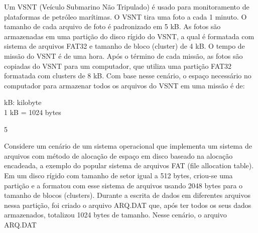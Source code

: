 %
{
\def\AMCbeginQuestion#1#2{\par\noindent{\bf (POSCOMP 2016 - Questão 46})}
\begin{question}{} Um VSNT (Veículo Submarino Não Tripulado) é usado para monitoramento de
plataformas de petróleo marítimas. O VSNT tira uma foto a cada 1 minuto. O tamanho de cada arquivo
de foto é padronizado em 5 kB. As fotos são armazenadas em uma partição do disco rígido do VSNT,
a qual é formatada com sistema de arquivos FAT32 e tamanho de bloco (cluster) de 4 kB. O tempo
de missão do VSNT é de uma hora. Após o término de cada missão, as fotos são copiadas do VSNT
para um computador, que utiliza uma partição FAT32 formatada com clusters de 8 kB. Com base
nesse cenário, o espaço necessário no computador para armazenar todos os arquivos do VSNT em
uma missão é de:
\begin{tcolorbox}[
	colback=white,
	colframe=black,
	boxrule=0.8pt,
	arc=0pt,
	width=0.5\textwidth,
	left=8pt, right=8pt, top=6pt, bottom=6pt
	]
	\noindent kB: kilobyte \\
	1 kB = 1024 bytes
\end{tcolorbox}
\begin{multicols}{5}\columnseprule=0.1pt
\begin{choices}
\end{choices}
\end{multicols}
\end{question}
}
{
\def\AMCbeginQuestion#1#2{\par\noindent{\bf (POSCOMP 2015 - Questão 46)}}
\begin{question}{} Considere um cenário de um sistema operacional que implementa um sistema de arquivos com método de alocação de espaço em disco baseado na alocação encadeada, a exemplo do popular sistema de arquivos FAT (file allocation table). Em um disco rígido com tamanho de setor igual a 512 bytes, criou-se uma partição e a formatou com esse sistema de arquivos usando 2048 bytes para o tamanho de blocos (clusters). Durante a escrita de dados em diferentes arquivos nessa partição, foi criado o arquivo ARQ.DAT que, após ter todos os seus dados armazenados, totalizou 1024 bytes de tamanho. Nesse cenário, o arquivo ARQ.DAT
	
\begin{choices}
\end{choices}
\end{question}
}
